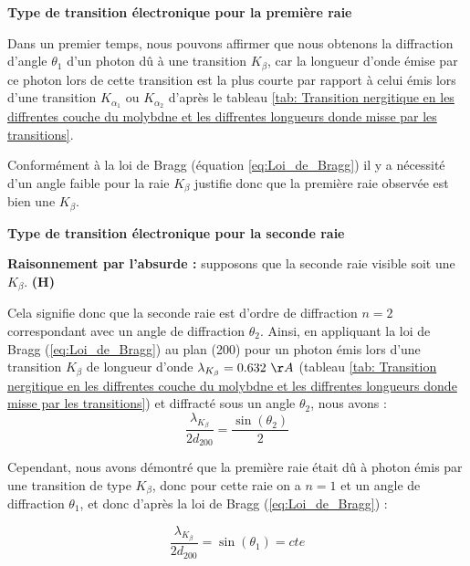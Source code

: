\begin{flushleft}
	\textbf{Type de transition électronique pour la première raie}	
\end{flushleft}

Dans un premier temps, nous pouvons affirmer que nous obtenons la diffraction d'angle $\theta_1$ d'un photon dû à une transition $K_{\beta}$, car la longueur d'onde émise par ce photon lors de cette transition est la plus courte par rapport à celui émis lors d'une transition $K_{\alpha_1}$ ou $K_{\alpha_2}$ d'après le tableau \ref{tab: Transition nergitique en les diffrentes couche du molybdne et les diffrentes longueurs donde misse par les transitions}.

Conformément à la loi de Bragg (équation \ref{eq:Loi_de_Bragg}) il y a nécessité d'un angle faible pour la raie $K_{\beta}$ justifie donc que la première raie observée est bien une $K_{\beta}$.

\begin{flushleft}
	\textbf{Type de transition électronique pour la seconde raie}	
\end{flushleft}

\textbf{Raisonnement par l'absurde : } supposons que la seconde raie visible soit une $K_{\beta}$. \textbf{(H)} \

\vspace{0.2cm}

Cela signifie donc que la seconde raie est d'ordre de diffraction $n=2$ correspondant avec un angle de diffraction $\theta_2$.
Ainsi, en appliquant la loi de Bragg (\ref{eq:Loi_de_Bragg}) au plan (200) pour un photon émis lors d'une transition $K_{\beta}$ de longueur d'onde $\lambda_{K_{\beta}} = 0.632 \ \AA$ (tableau \ref{tab: Transition nergitique en les diffrentes couche du molybdne et les diffrentes longueurs donde misse par les transitions}) et diffracté sous un angle $\theta_{2}$, nous avons :
\begin{equation} \label{eq: photon K_beta + Bragg}
	\frac{\lambda_{K_{\beta}}}{2d_{200}}=\frac{\sin(\theta_{2})}{2}
\end{equation}

Cependant, nous avons démontré que la première raie était dû à photon émis par une transition de type $K_{\beta}$, donc pour cette raie on a $n=1$ et un angle de diffraction $\theta_{1}$, et donc d'après la loi de Bragg (\ref{eq:Loi_de_Bragg}) :

\begin{equation} \label{eq: constant Bragg}
	\frac{\lambda_{K_{\beta}}}{2d_{200}}=\sin(\theta_{1}) = cte
\end{equation}

